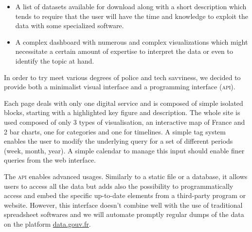 \documentclass[11pt,a4paper,twocolumn,USenglish]{article}
\begin{document}
\begin{itemize}
    \item A list of datasets available for download along with a short description which tends to require that the user will have the time and knowledge to exploit the data with some specialized software.
    \item A complex dashboard with numerous and complex visualizations which might necessitate a certain amount of expertise to interpret the data or even to identify the topic at hand.
\end{itemize}

In order to try meet various degrees of police and tech savviness, we decided to provide both a minimalist visual interface and a programming interface (\textsc{api}).

Each page deals with only one digital service and is composed of simple isolated blocks, starting with a highlighted key figure and description. The whole site is used composed of only 3 types of visualisation, an interactive map of France and 2 bar charts, one for categories and one for timelines. A simple tag system enables the user to modify the underlying query for a set of different periods (week, month, year). A simple calendar to manage this input should enable finer queries from the web interface.

The \textsc{api} enables advanced usages. Similarly to a static file or a database, it allows users to access all the data but adds also the possibility to programmatically access and embed the specific up-to-date elements from a third-party program or website. However, this interface doesn't combine well with the use of traditional spreadsheet softwares and we will automate promptly regular dumps of the data on the platform \href{https://data.gouv.fr}{data.gouv.fr}.
\end{document}
